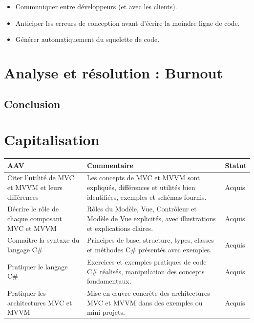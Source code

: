 \begin{itemize}
	\item Communiquer entre développeurs (et avec les clients).
	\item Anticiper les erreurs de conception avant d'écrire la moindre ligne de code.
	\item Générer automatiquement du squelette de code.
\end{itemize}

\newpage

\section*{Analyse et résolution : Burnout}

\subsection*{Conclusion}
{}

\newpage

\section*{Capitalisation}

\begin{center}
\setlength{\tabcolsep}{10pt}

\begin{tabular}{|p{}|p{}|m{}|}
\hline
\textbf{AAV} & \textbf{Commentaire} & \textbf{Statut} \\ \hline

Citer l'utilité de MVC et MVVM et leurs différences &
Les concepts de MVC et MVVM sont expliqués, différences et utilités bien identifiées, exemples et schémas fournis. &
{\color{green!60!black}Acquis} \\ \hline

Décrire le rôle de chaque composant MVC et MVVM &
Rôles du Modèle, Vue, Contrôleur et Modèle de Vue explicités, avec illustrations et explications claires. &
{\color{green!60!black}Acquis} \\ \hline

Connaître la syntaxe du langage C\# &
Principes de base, structure, types, classes et méthodes C\# présentés avec exemples. &
{\color{green!60!black}Acquis} \\ \hline

Pratiquer le langage C\# &
Exercices et exemples pratiques de code C\# réalisés, manipulation des concepts fondamentaux. &
{\color{green!60!black}Acquis} \\ \hline

Pratiquer les architectures MVC et MVVM &
Mise en œuvre concrète des architectures MVC et MVVM dans des exemples ou mini-projets. &
{\color{green!60!black}Acquis} \\ \hline

\end{tabular}
\end{center}

